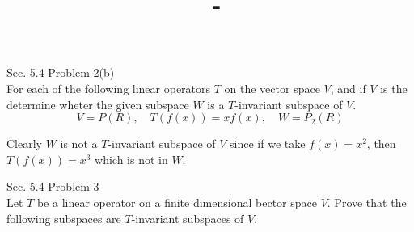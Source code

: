 \documentclass[answers,12pt,addpoints]{exam}
\author{\name}
\title{\course \ - \assignment}
\begin{document}
\maketitle


\begin{questions}
    \question Sec. 5.4 Problem 2(b)\\
    For each of the following linear operators $T$ on the vector space $V$, and if $V$ is the determine wheter the given subspace $W$ is a $T$-invariant subspace of $V$.\\
    $$V = P(R), \quad T(f(x)) =xf(x), \quad W = P_2(R)$$
    \begin{solution}
        Clearly $W$ is not a $T$-invariant subspace of $V$ since if we take $f(x) = x^2$, then $T(f(x)) = x^3$ which is not in $W$.
    \end{solution}
    \question Sec. 5.4 Problem 3\\
    Let $T$ be a linear operator on a finite dimensional bector space $V$. Prove that the following subspaces are $T$-invariant subspaces of $V$.\\
\end{questions}
\end{document}
